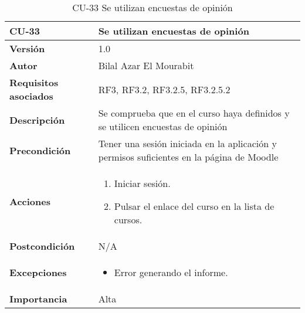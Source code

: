\begin{table}[H]
	\centering
	\begin{tabularx}{\linewidth}{ p{} p{} }
		\toprule
		\textbf{CU-33}    & \textbf{Se utilizan encuestas de opinión}\\
		\toprule
		\textbf{Versión}              & 1.0    \\
		\textbf{Autor}                & Bilal Azar El Mourabit \\
		\textbf{Requisitos asociados} & RF3, RF3.2, RF3.2.5, RF3.2.5.2\\
		\textbf{Descripción}          & Se comprueba que en  el curso haya definidos y se utilicen encuestas de opinión\\
    		\textbf{Precondición}         & Tener una sesión iniciada en la aplicación y permisos suficientes en la página de Moodle\\
		\textbf{Acciones}             & 
		\begin{enumerate}
			\def\labelenumi{\arabic{enumi}.}
			\tightlist
			\item Iniciar sesión.
            \item Pulsar el enlace del curso en la lista de cursos. 
		\end{enumerate}\\
		\textbf{Postcondición}        & N/A \\
		\textbf{Excepciones}          & \begin{itemize}
		    \item Error generando el informe.
		\end{itemize} \\
		\textbf{Importancia}          & Alta \\
		\bottomrule
	\end{tabularx}
	\caption{CU-33 Se utilizan encuestas de opinión}
\end{table}

